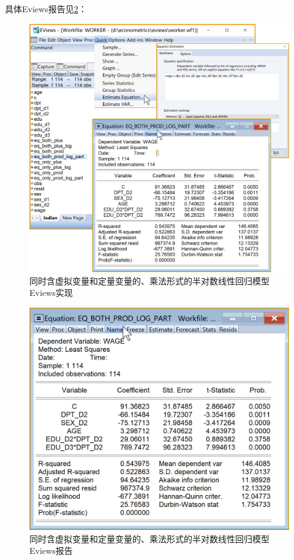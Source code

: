 \documentclass[12pt,(landscape,a4paper),(portrait,a4paper)]{article}
\theoremstyle{definition}
\theoremstyle{definition}
\theoremstyle{definition}
\theoremstyle{remark}
\begin{document}
具体Eviews报告见\ref{fig:both-prod-log-part-report}：

\begin{figure}

{\centering \includegraphics[width=26.89in]{picture/lab8-dummy-model/3-both-prod-log-part} 

}

\caption{同时含虚拟变量和定量变量的、乘法形式的半对数线性回归模型Eviews实现}\label{fig:both-prod-log-part}
\end{figure}

\begin{figure}

{\centering \includegraphics[width=18.53in]{picture/lab8-dummy-model/3-both-prod-log-part-report} 

}

\caption{同时含虚拟变量和定量变量的、乘法形式的半对数线性回归模型Eviews报告}\label{fig:both-prod-log-part-report}
\end{figure}
\end{document}
